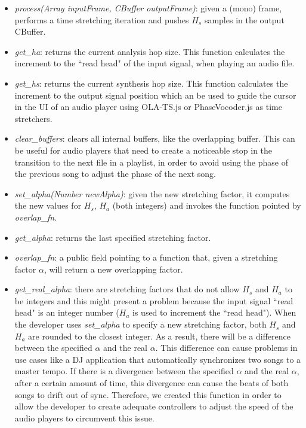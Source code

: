 \documentclass{sig-alternate}
\begin{document}
\begin{sloppypar}
\begin{itemize}
	\item \textit{process(Array inputFrame, CBuffer outputFrame)}: given a (mono) frame, performs a time stretching iteration and pushes $H_s$ samples in the output CBuffer.
	\item \textit{get\_ha}: returns the current analysis hop size. This function calculates the increment to the ``read head" of the input signal, when playing an audio file.
	\item \textit{get\_hs}: returns the current synthesis hop size. This function calculates the increment to the output signal position which an be used to guide the cursor in the UI of an audio player using OLA-TS.js or PhaseVocoder.js as time stretchers.
	\item \textit{clear\_buffers}: clears all internal buffers, like the overlapping buffer. This can be useful for audio players that need to create a noticeable stop in the transition to the next file in a playlist, in order to avoid using the phase of the previous song to adjust the phase of the next song.
	\item \textit{set\_alpha(Number newAlpha)}: given the new stretching factor, it computes the new values for $H_s$, $H_a$ (both integers) and invokes the function pointed by \textit{overlap\_fn}.
	\item \textit{get\_alpha}: returns the last specified stretching factor.
	\item \textit{overlap\_fn}: a public field pointing to a function that, given a stretching factor $\alpha$, will return a new overlapping factor.
	\item \textit{get\_real\_alpha}: there are stretching factors that do not allow $H_s$ and $H_a$ to be integers and this might present a problem because the input signal ``read head" is an integer number ($H_a$ is used to increment the ``read head"). When the developer uses \textit{set\_alpha} to specify a new stretching factor, both $H_s$ and $H_a$ are rounded to the closest integer. As a result, there will be a difference between the specified $\alpha$ and the real $\alpha$. This difference can cause problems in use cases like a DJ application that automatically synchronizes two songs to a master tempo. If there is a divergence between the specified $\alpha$ and the real $\alpha$, after a certain amount of time, this divergence can cause the beats of both songs to drift out of sync. Therefore, we created this function in order to allow the developer to create adequate controllers to adjust the speed of the audio players to circumvent this issue. 
\end{itemize}


\end{sloppypar}
\end{document}
